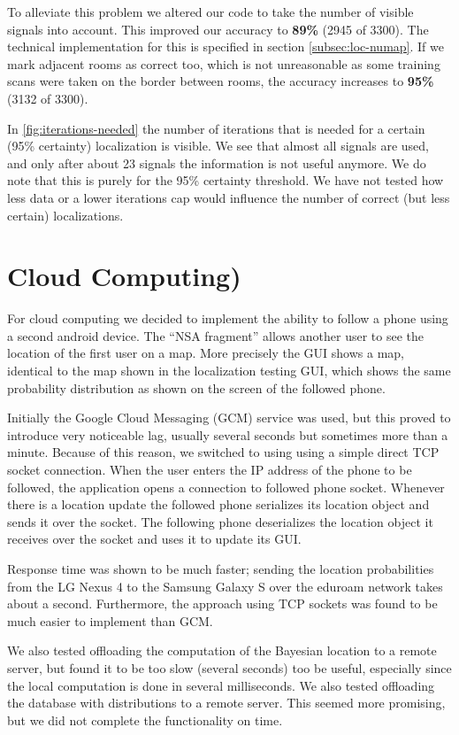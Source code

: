 \documentclass[a4paper,10pt,twoside]{IEEEtran}
\begin{document}
To alleviate this problem we altered our code to take the number of visible signals into account.
This improved our accuracy to \textbf{89\%} (2945 of 3300).
The technical implementation for this is specified in section \ref{subsec:loc-numap}.
If we mark adjacent rooms as correct too, which is not unreasonable as some training scans were taken on the border between rooms, the accuracy increases to \textbf{95\%} (3132 of 3300).

In \autoref{fig:iterations-needed} the number of iterations that is needed for a certain (95\% certainty) localization is visible.
We see that almost all signals are used, and only after about 23 signals the information is not useful anymore.
We do note that this is purely for the 95\% certainty threshold.
We have not tested how less data or a lower iterations cap would influence the number of correct (but less certain) localizations.

\section{Cloud Computing)}
\label{sec:cloud-computing}

For cloud computing we decided to implement the ability to follow a phone using a second android device.
The ``NSA fragment'' allows another user to see the location of the first user on a map. More precisely the GUI shows a map, identical to the map shown in the localization testing GUI, which shows the same probability distribution as shown on the screen of the followed phone.

Initially the Google Cloud Messaging (GCM) service was used, but this proved to introduce very noticeable lag, usually several seconds but sometimes more than a minute.
Because of this reason, we switched to using using a simple direct TCP socket connection.
When the user enters the IP address of the phone to be followed, the application opens a connection to followed phone socket.
Whenever there is a location update the followed phone serializes its location object and sends it over the socket.
The following phone deserializes the location object it receives over the socket and uses it to update its GUI.

Response time was shown to be much faster; sending the location probabilities from the LG Nexus 4 to the Samsung Galaxy S over the eduroam network takes about a second. Furthermore, the approach using TCP sockets was found to be much easier to implement than GCM.

We also tested offloading the computation of the Bayesian location to a remote server, but found it to be too slow (several seconds) too be useful, especially since the local computation is done in several milliseconds.
We also tested offloading the database with distributions to a remote server.
This seemed more promising, but we did not complete the functionality on time.
\end{document}

